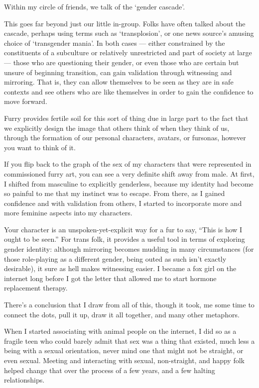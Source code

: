 Within my circle of friends, we talk of the `gender cascade'.

This goes far beyond just our little in-group.  Folks have often talked about the cascade, perhaps using terms such as `transplosion', or one news source's amusing choice of `transgender mania'.  In both cases --- either constrained by the constituents of a subculture or relatively unrestricted and part of society at large --- those who are questioning their gender, or even those who are certain but unsure of beginning transition, can gain validation through witnessing and mirroring.  That is, they can allow themselves to be seen as they are in safe contexts and see others who are like themselves in order to gain the confidence to move forward.

Furry provides fertile soil for this sort of thing due in large part to the fact that we explicitly design the image that others think of when they think of us, through the formation of our personal characters, avatars, or fursonas, however you want to think of it.

If you flip back to the graph of the sex of my characters that were represented in commissioned furry art, you can see a very definite shift away from male.  At first, I shifted from masculine to explicitly genderless, because my identity had become so painful to me that my instinct was to escape.  From there, as I gained confidence and with validation from others, I started to incorporate more and more feminine aspects into my characters.

Your character is an unspoken-yet-explicit way for a fur to say, ``This is how I ought to be seen.''  For trans folk, it provides a useful tool in terms of exploring gender identity: although mirroring becomes mudding in many circumstances (for those role-playing as a different gender, being outed as such isn't exactly desirable), it sure as hell makes witnessing easier.  I became a fox girl on the internet long before I got the letter that allowed me to start hormone replacement therapy.

There's a conclusion that I draw from all of this, though it took, me some time to connect the dots, pull it up, draw it all together, and many other metaphors.

When I started associating with animal people on the internet, I did so as a fragile teen who could barely admit that sex was a thing that existed, much less a being with a sexual orientation, never mind one that might not be straight, or even sexual.  Meeting and interacting with sexual, non-straight, and happy folk helped change that over the process of a few years, and a few halting relationships.

